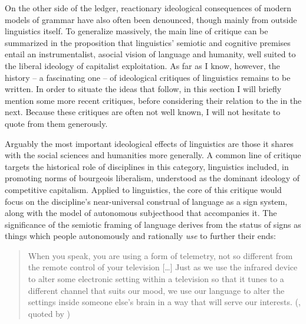 \documentclass[output=paper]{langscibook}
\begin{document}
On the other side of the ledger, reactionary ideological consequences of modern models of grammar have also often been denounced, though mainly from outside linguistics itself. To generalize massively, the main line of critique can be summarized in the proposition that linguistics' semiotic and cognitive premises entail an instrumentalist, asocial vision of language and humanity, well suited to the liberal ideology of capitalist exploitation. As far as I know, however, the history -- a fascinating one -- of ideological critiques of linguistics remains to be written. In order to situate the ideas that follow, in this section I will briefly mention some more recent critiques, before considering their relation to the  in the next. Because these critiques are often not well known, I will not hesitate to quote from them generously.

Arguably the most important ideological effects of linguistics are those  it shares with the social sciences and humanities more generally. A common line of critique targets the historical role of disciplines in this category, linguistics included, in promoting norms of bourgeois liberalism, understood as the dominant ideology of competitive capitalism. Applied to linguistics, the core of this critique would focus on the discipline's near-universal construal of language as a sign system, along with the model of autonomous subjecthood that accompanies it. The significance of the semiotic framing of language derives from the status of signs as things which people autonomously and rationally \emph{use} to further their ends:

\begin{quotation}
When you speak, you are using a form of telemetry, not so different from the remote control of your television […] Just as we use the infrared device to alter some electronic setting within a television so that it tunes to a different channel that suits our mood, we use our language to alter the settings inside someone else’s brain in a way that will serve our interests. (\citealt[275--276]{Pagel2012}, quoted by \citealt[75]{EnfieldSidnell2017})
\end{quotation}
\end{document}
